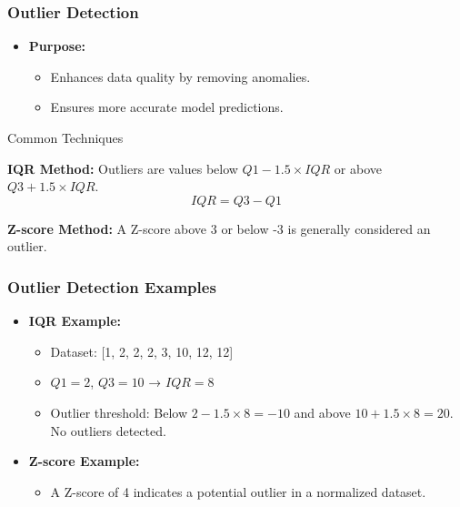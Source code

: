 \documentclass[aspectratio=169]{beamer}
\begin{document}
\begin{frame}[fragile]
    \frametitle{Outlier Detection}
    \begin{itemize}
        \item \textbf{Purpose:}
        \begin{itemize}
            \item Enhances data quality by removing anomalies.
            \item Ensures more accurate model predictions.
        \end{itemize}
    \end{itemize}
    
    \begin{block}{Common Techniques}
        \item \textbf{IQR Method:} Outliers are values below $Q1 - 1.5 \times IQR$ or above $Q3 + 1.5 \times IQR$.
        \begin{equation}
            IQR = Q3 - Q1
        \end{equation}
        
        \item \textbf{Z-score Method:} A Z-score above 3 or below -3 is generally considered an outlier.
    \end{block}
\end{frame}

\begin{frame}[fragile]
    \frametitle{Outlier Detection Examples}
    \begin{itemize}
        \item \textbf{IQR Example:}
        \begin{itemize}
            \item Dataset: [1, 2, 2, 2, 3, 10, 12, 12]
            \item $Q1 = 2$, $Q3 = 10$ → $IQR = 8$
            \item Outlier threshold: Below $2 - 1.5 \times 8 = -10$ and above $10 + 1.5 \times 8 = 20$. No outliers detected.
        \end{itemize}
        \item \textbf{Z-score Example:}
        \begin{itemize}
            \item A Z-score of 4 indicates a potential outlier in a normalized dataset.
        \end{itemize}
    \end{itemize}
\end{frame}
\end{document}
